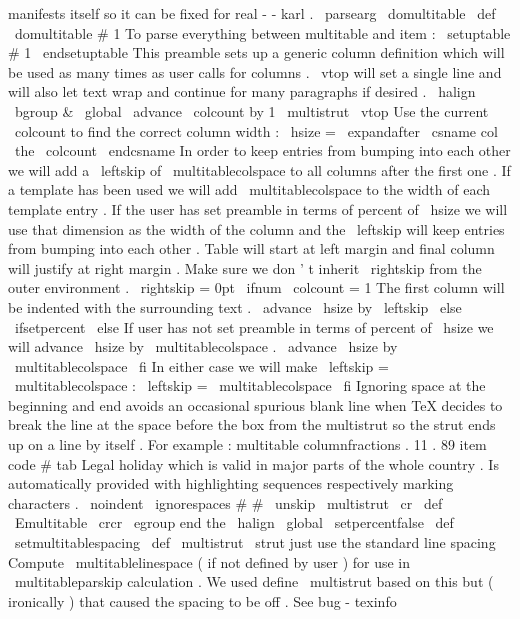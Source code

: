 {{{{manifests
itself
so
it
can
be
fixed
for
real
-
-
karl
.
}
%
}
%
%
\
parsearg
\
domultitable
}
\
def
\
domultitable
#
1
{
%
%
To
parse
everything
between
multitable
and
item
:
\
setuptable
#
1
\
endsetuptable
%
%
This
preamble
sets
up
a
generic
column
definition
which
will
%
be
used
as
many
times
as
user
calls
for
columns
.
%
\
vtop
will
set
a
single
line
and
will
also
let
text
wrap
and
%
continue
for
many
paragraphs
if
desired
.
\
halign
\
bgroup
&
%
\
global
\
advance
\
colcount
by
1
\
multistrut
\
vtop
{
%
%
Use
the
current
\
colcount
to
find
the
correct
column
width
:
\
hsize
=
\
expandafter
\
csname
col
\
the
\
colcount
\
endcsname
%
%
In
order
to
keep
entries
from
bumping
into
each
other
%
we
will
add
a
\
leftskip
of
\
multitablecolspace
to
all
columns
after
%
the
first
one
.
%
%
If
a
template
has
been
used
we
will
add
\
multitablecolspace
%
to
the
width
of
each
template
entry
.
%
%
If
the
user
has
set
preamble
in
terms
of
percent
of
\
hsize
we
will
%
use
that
dimension
as
the
width
of
the
column
and
the
\
leftskip
%
will
keep
entries
from
bumping
into
each
other
.
Table
will
start
at
%
left
margin
and
final
column
will
justify
at
right
margin
.
%
%
Make
sure
we
don
'
t
inherit
\
rightskip
from
the
outer
environment
.
\
rightskip
=
0pt
\
ifnum
\
colcount
=
1
%
The
first
column
will
be
indented
with
the
surrounding
text
.
\
advance
\
hsize
by
\
leftskip
\
else
\
ifsetpercent
\
else
%
If
user
has
not
set
preamble
in
terms
of
percent
of
\
hsize
%
we
will
advance
\
hsize
by
\
multitablecolspace
.
\
advance
\
hsize
by
\
multitablecolspace
\
fi
%
In
either
case
we
will
make
\
leftskip
=
\
multitablecolspace
:
\
leftskip
=
\
multitablecolspace
\
fi
%
Ignoring
space
at
the
beginning
and
end
avoids
an
occasional
spurious
%
blank
line
when
TeX
decides
to
break
the
line
at
the
space
before
the
%
box
from
the
multistrut
so
the
strut
ends
up
on
a
line
by
itself
.
%
For
example
:
%
multitable
columnfractions
.
11
.
89
%
item
code
{
#
}
%
tab
Legal
holiday
which
is
valid
in
major
parts
of
the
whole
country
.
%
Is
automatically
provided
with
highlighting
sequences
respectively
%
marking
characters
.
\
noindent
\
ignorespaces
#
#
\
unskip
\
multistrut
}
\
cr
}
\
def
\
Emultitable
{
%
\
crcr
\
egroup
%
end
the
\
halign
\
global
\
setpercentfalse
}
\
def
\
setmultitablespacing
{
%
\
def
\
multistrut
{
\
strut
}
%
just
use
the
standard
line
spacing
%
%
Compute
\
multitablelinespace
(
if
not
defined
by
user
)
for
use
in
%
\
multitableparskip
calculation
.
We
used
define
\
multistrut
based
on
%
this
but
(
ironically
)
that
caused
the
spacing
to
be
off
.
%
See
bug
-
texinfo
}}
